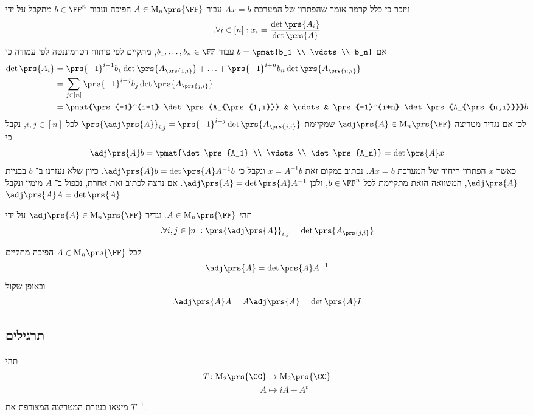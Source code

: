 \documentclass[a4paper,10pt,twoside,openany]{book}
\renewcommand{\Mat}{\mathrm{M}}
\begin{document}
ניזכר כי כלל קרמר אומר שהפתרון של המערכת
$Ax = b$
עבור
$A \in \Mat_n\prs{\FF}$
הפיכה
ועבור
$b \in \FF^n$
מתקבל על ידי
\[\text{.} \forall i \in [n]: x_i = \frac{\det\prs{A_i}}{\det\prs{A}}\]
אם
$b = \pmat{b_1 \\ \vdots \\ b_n}$
עבור
$b_1, \ldots, b_n \in \FF$,
מתקיים לפי פיתוח דטרמיננטה לפי עמודה כי
\begin{align*}
\det\prs{A_i} &= \prs{-1}^{i+1} b_1 \det\prs{A_{\prs{1,i}}} + \ldots + \prs{-1}^{i+n} b_n \det\prs{A_{\prs{n,i}}}
\\&= \sum_{j \in [n]} \prs{-1}^{i+j} b_j \det\prs{A_{\prs{j,i}}}
\\&= \pmat{\prs{-1}^{i+1} \det\prs{A_{\prs{1,i}}} & \cdots & \prs{-1}^{i+n} \det\prs{A_{\prs{n,i}}}} b
\end{align*}
לכן אם נגדיר מטריצה
$\adj\prs{A} \in \Mat_n\prs{\FF}$
שמקיימת
$\prs{\adj\prs{A}}_{i,j} = \prs{-1}^{i+j} \det\prs{A_{\prs{j,i}}}$
לכל
$i,j \in [n]$,
נקבל כי
\[\adj\prs{A} b = \pmat{\det\prs{A_1} \\ \vdots \\ \det\prs{A_n}} = \det\prs{A} x\]
כאשר
$x$
הפתרון היחיד של המערכת
$Ax = b$.
נכתוב במקום זאת
$x = A^{-1} b$
ונקבל כי
$\adj\prs{A} b = \det\prs{A} A^{-1} b$.
כיוון שלא נעזרנו ב־%
$b$
בבניית
$\adj\prs{A}$,
המשוואה הזאת מתקיימת לכל
$b \in \FF^n$,
ולכן
$\adj\prs{A} = \det\prs{A} A^{-1}$.
אם נרצה לכתוב זאת אחרת, נכפול ב־%
$A$
מימין ונקבל
$\adj\prs{A} A = \det\prs{A}$.

\begin{definition}
תהי
$A \in \Mat_n\prs{\FF}$.
נגדיר
$\adj\prs{A} \in \Mat_n\prs{\FF}$
על ידי
\[\text{.} \forall i,j \in [n]: \prs{\adj\prs{A}}_{i,j} = \det\prs{A_{\prs{j,i}}}\]
\end{definition}

\begin{proposition}
לכל
$A \in \Mat_n\prs{\FF}$
הפיכה מתקיים
\[\adj\prs{A} = \det\prs{A} A^{-1}\]
ובאופן שקול
\[\text{.} \adj\prs{A} A = A \adj\prs{A} = \det\prs{A} I\]
\end{proposition}

\subsection{תרגילים}

\begin{exercisechap}
תהי
\begin{align*}
T \colon \Mat_2\prs{\CC} &\to \Mat_2\prs{\CC} \\
A &\mapsto i A + A^t
\end{align*}
מיצאו בעזרת המטריצה המצורפת את
$T^{-1}$.
\end{exercisechap}
\end{document}
